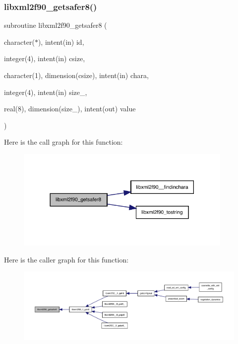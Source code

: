 \subsubsection{\texorpdfstring{libxml2f90\+\_\+getsafer8()}{libxml2f90\_getsafer8()}}
{\footnotesize\ttfamily subroutine libxml2f90\+\_\+getsafer8 (\begin{DoxyParamCaption}\item[{character($\ast$), intent(in)}]{id,  }\item[{integer(4), intent(in)}]{csize,  }\item[{character(1), dimension(csize), intent(in)}]{chara,  }\item[{integer(4), intent(in)}]{size\+\_\+,  }\item[{real(8), dimension(size\+\_\+), intent(out)}]{value }\end{DoxyParamCaption})}

Here is the call graph for this function\+:
\nopagebreak
\begin{figure}[H]
\begin{center}
\leavevmode
\includegraphics[width=297pt]{libxml2f90_8f90__pp_8f90_a7851da50fe7a6768aa6f0d04aa9345a0_cgraph}
\end{center}
\end{figure}
Here is the caller graph for this function\+:
\nopagebreak
\begin{figure}[H]
\begin{center}
\leavevmode
\includegraphics[width=350pt]{libxml2f90_8f90__pp_8f90_a7851da50fe7a6768aa6f0d04aa9345a0_icgraph}
\end{center}
\end{figure}
\mbox{\label{libxml2f90_8f90__pp_8f90_a1eaede8d08ffde30b3ef74f657ac0126}} 
